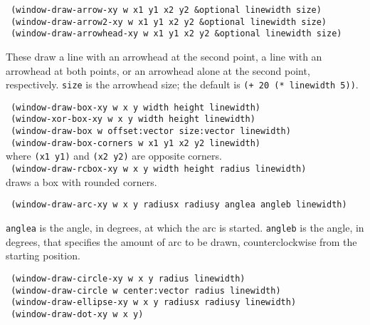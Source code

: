 \vspace{0.1in}
{\tt \hspace*{0.5in}
 (window-draw-arrow-xy w x1 y1 x2 y2 \&optional linewidth size)} \\
{\tt \hspace*{0.5in}
 (window-draw-arrow2-xy w x1 y1 x2 y2 \&optional linewidth size)} \\
{\tt \hspace*{0.5in}
 (window-draw-arrowhead-xy w x1 y1 x2 y2 \&optional linewidth size)}

\vspace{-0.1in}
These draw a line with an arrowhead at the second point, a line with an
arrowhead at both points, or an arrowhead alone at the second point,
respectively.  {\tt size} is the arrowhead size; the default is
{\tt (+ 20 (* linewidth 5))}.

\vspace{0.1in}
{\tt \hspace*{0.5in} (window-draw-box-xy w x y width height linewidth)} \\
{\tt \hspace*{0.5in} (window-xor-box-xy w x y width height linewidth)} \\
{\tt \hspace*{0.5in} (window-draw-box w offset:vector size:vector linewidth)} \\
{\tt \hspace*{0.5in} (window-draw-box-corners w x1 y1 x2 y2 linewidth)} \\
 \hspace*{1.0in} where {\tt (x1 y1)} and {\tt (x2 y2)} are opposite corners. \\
{\tt \hspace*{0.5in} (window-draw-rcbox-xy w x y width height radius linewidth)} \\
 \hspace*{1.0in} draws a box with rounded corners.

{\tt \hspace*{0.5in} (window-draw-arc-xy w x y radiusx radiusy anglea angleb linewidth)}

\vspace{-0.1in}
{\tt anglea} is the angle, in degrees, at which the arc is started.
{\tt angleb} is the angle, in degrees, that specifies the amount of arc
to be drawn, counterclockwise from the starting position.

\vspace{0.1in}
{\tt \hspace*{0.5in} (window-draw-circle-xy w x y radius linewidth)} \\
{\tt \hspace*{0.5in} (window-draw-circle w center:vector radius linewidth)} \\
{\tt \hspace*{0.5in} (window-draw-ellipse-xy w x y radiusx radiusy linewidth)} \\
{\tt \hspace*{0.5in} (window-draw-dot-xy w x y)}


